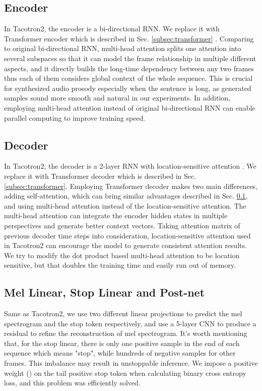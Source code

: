 \documentclass[letterpaper]{article} \usepackage{aaai19}  \usepackage{times}  \usepackage{helvet}  \usepackage{courier}  \usepackage{url}  \usepackage{graphicx}  \frenchspacing
\begin{document}
\subsection{Encoder}
\label{subsec:encoder}
In Tacotron2, the encoder is a bi-directional RNN. We replace it with Transformer encoder which is described in Sec. \ref{subsec:transformer} . Comparing to original bi-directional RNN, multi-head attention splits one attention into several subspaces so that it can model the frame relationship in multiple different aspects, and it directly builds the long-time dependency between any two frames thus each of them considers global context of the whole sequence. This is crucial for synthesized audio prosody especially when the sentence is long, as generated samples sound more smooth and natural in our experiments. In addition, employing multi-head attention instead of original bi-directional RNN can enable parallel computing to improve training speed.

\subsection{Decoder}


In Tacotron2, the decoder is a 2-layer RNN with location-sensitive attention \cite{chorowski2015attention}. We replace it with Transformer decoder which is described in Sec. \ref{subsec:transformer}.
Employing Transformer decoder makes two main differences, adding self-attention, which can bring similar advantages described in Sec. \ref{subsec:encoder}, and using multi-head attention instead of the location-sensitive attention. The multi-head attention can integrate the encoder hidden states in multiple perspectives and generate better context vectors.
Taking attention matrix of previous decoder time steps into consideration, location-sensitive attention used in Tacotron2 can encourage the model to generate consistent attention results.
We try to modify the dot product based multi-head attention to be location sensitive, but that doubles the training time and easily run out of memory.

\subsection{Mel Linear, Stop Linear and Post-net}
Same as Tacotron2, we use two different linear projections to predict the mel spectrogram and the stop token respectively, and use a 5-layer CNN to produce a residual to refine the reconstruction of mel spectrogram. It's worth mentioning that, for the stop linear, there is only one positive sample in the end of each sequence which means "stop", while hundreds of negative samples for other frames. This imbalance may result in unstoppable inference. We impose a positive weight () on the tail positive stop token when calculating binary cross entropy loss, and this problem was efficiently solved.
\end{document}

